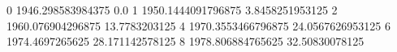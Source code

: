 0 1946.298583984375 0.0
1 1950.1444091796875 3.8458251953125
2 1960.076904296875 13.7783203125
4 1970.3553466796875 24.0567626953125
6 1974.4697265625 28.171142578125
8 1978.806884765625 32.50830078125
